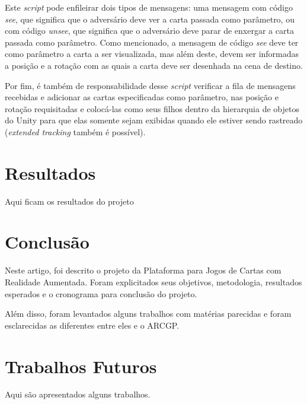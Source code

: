 \documentclass[conference]{IEEEtran}
\begin{document}
Este \textit{script} pode enfileirar dois tipos de mensagens: uma mensagem com 
código \textit{see}, que significa que o adversário deve ver a carta passada 
como parâmetro, ou com código \textit{unsee}, que significa que o adversário 
deve parar de enxergar a carta passada como parâmetro. Como mencionado, 
a mensagem de código \textit{see} deve ter como parâmetro a carta a ser 
visualizada, mas além deste, devem ser informadas a posição e a rotação com as 
quais a carta deve ser desenhada na cena de destino.

Por fim, é também de responsabilidade desse \textit{script} verificar a fila de 
mensagens recebidas e adicionar as cartas especificadas como parâmetro, nas 
posição e rotação requisitadas e colocá-las como seus filhos dentro da 
hierarquia de objetos do Unity para que elas somente sejam exibidas quando ele 
estiver sendo rastreado (\textit{extended tracking} também é possível).

\section{Resultados}
\label{resultados}
Aqui ficam os resultados do projeto

\section{Conclusão}
\label{conclusao}
Neste artigo, foi descrito o projeto da Plataforma para Jogos de Cartas com 
Realidade Aumentada. Foram explicitados seus objetivos, metodologia, resultados 
esperados e o cronograma para conclusão do projeto.

Além disso, foram levantados alguns trabalhos com matérias parecidas e foram 
esclarecidas as diferentes entre eles e o ARCGP.

\section{Trabalhos Futuros}
\label{trab_fut}
Aqui são apresentados alguns trabalhos.



\end{document}
